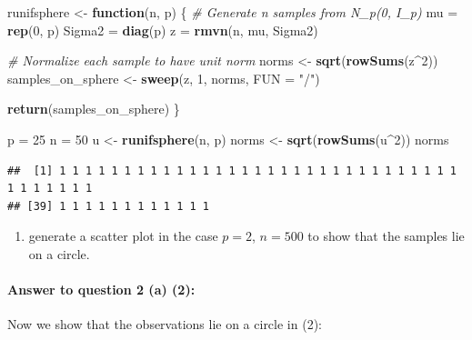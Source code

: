 \documentclass[
]{article}
\newenvironment{Shaded}{\begin{snugshade}}{\end{snugshade}}
\newcommand{\AttributeTok}[1]{\textcolor[rgb]{0.13,0.29,0.53}{#1}}
\newcommand{\CommentTok}[1]{\textcolor[rgb]{0.56,0.35,0.01}{\textit{#1}}}
\newcommand{\ControlFlowTok}[1]{\textcolor[rgb]{0.13,0.29,0.53}{\textbf{#1}}}
\newcommand{\DecValTok}[1]{\textcolor[rgb]{0.00,0.00,0.81}{#1}}
\newcommand{\FunctionTok}[1]{\textcolor[rgb]{0.13,0.29,0.53}{\textbf{#1}}}
\newcommand{\NormalTok}[1]{#1}
\newcommand{\OtherTok}[1]{\textcolor[rgb]{0.56,0.35,0.01}{#1}}
\newcommand{\SpecialCharTok}[1]{\textcolor[rgb]{0.81,0.36,0.00}{\textbf{#1}}}
\newcommand{\StringTok}[1]{\textcolor[rgb]{0.31,0.60,0.02}{#1}}
\providecommand{\tightlist}{%
  \setlength{\itemsep}{0pt}\setlength{\parskip}{0pt}}
\begin{document}
\begin{Shaded}
\begin{Highlighting}[]
\NormalTok{runifsphere }\OtherTok{\textless{}{-}} \ControlFlowTok{function}\NormalTok{(n, p) \{}
  \CommentTok{\# Generate n samples from N\_p(0, I\_p)}
\NormalTok{  mu }\OtherTok{=} \FunctionTok{rep}\NormalTok{(}\DecValTok{0}\NormalTok{, p)}
\NormalTok{  Sigma2 }\OtherTok{=} \FunctionTok{diag}\NormalTok{(p) }
\NormalTok{  z }\OtherTok{=} \FunctionTok{rmvn}\NormalTok{(n, mu, Sigma2)}

  
  \CommentTok{\# Normalize each sample to have unit norm}
\NormalTok{  norms }\OtherTok{\textless{}{-}} \FunctionTok{sqrt}\NormalTok{(}\FunctionTok{rowSums}\NormalTok{(z}\SpecialCharTok{\^{}}\DecValTok{2}\NormalTok{))}
\NormalTok{  samples\_on\_sphere }\OtherTok{\textless{}{-}} \FunctionTok{sweep}\NormalTok{(z, }\DecValTok{1}\NormalTok{, norms, }\AttributeTok{FUN =} \StringTok{"/"}\NormalTok{)}
  
  \FunctionTok{return}\NormalTok{(samples\_on\_sphere)}
\NormalTok{\}}

\NormalTok{p }\OtherTok{=} \DecValTok{25}
\NormalTok{n }\OtherTok{=} \DecValTok{50}
\NormalTok{u }\OtherTok{\textless{}{-}} \FunctionTok{runifsphere}\NormalTok{(n, p)}
\NormalTok{norms }\OtherTok{\textless{}{-}} \FunctionTok{sqrt}\NormalTok{(}\FunctionTok{rowSums}\NormalTok{(u}\SpecialCharTok{\^{}}\DecValTok{2}\NormalTok{))}
\NormalTok{norms}
\end{Highlighting}
\end{Shaded}

\begin{verbatim}
##  [1] 1 1 1 1 1 1 1 1 1 1 1 1 1 1 1 1 1 1 1 1 1 1 1 1 1 1 1 1 1 1 1 1 1 1 1 1 1 1
## [39] 1 1 1 1 1 1 1 1 1 1 1 1
\end{verbatim}

\begin{enumerate}
\def\labelenumi{(\arabic{enumi})}
\setcounter{enumi}{1}
\tightlist
\item
  generate a scatter plot in the case \(p = 2\), \(n = 500\) to show
  that the samples lie on a circle.
\end{enumerate}

\paragraph{\texorpdfstring{\textbf{Answer to question 2 (a)
(2)}:}{Answer to question 2 (a) (2):}}\label{answer-to-question-2-a-2}

Now we show that the observations lie on a circle in (2):
\end{document}
